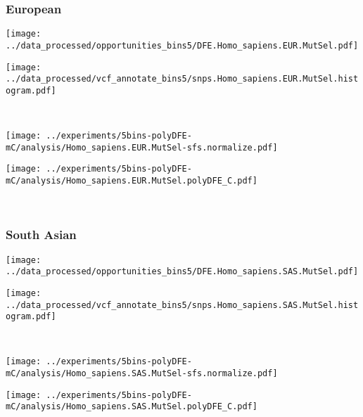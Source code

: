 \subsubsection{European}

\begin{minipage}{0.49\linewidth}
    \texttt{[image: ../data\_processed/opportunities\_bins5/DFE.Homo\_sapiens.EUR.MutSel.pdf]}
\end{minipage}
\begin{minipage}{0.49\linewidth}
    \texttt{[image: ../data\_processed/vcf\_annotate\_bins5/snps.Homo\_sapiens.EUR.MutSel.histogram.pdf]}
\end{minipage}
\\
\begin{minipage}{0.49\linewidth}
    \texttt{[image: ../experiments/5bins-polyDFE-mC/analysis/Homo\_sapiens.EUR.MutSel-sfs.normalize.pdf]}
\end{minipage}
\begin{minipage}{0.49\linewidth}
    \texttt{[image: ../experiments/5bins-polyDFE-mC/analysis/Homo\_sapiens.EUR.MutSel.polyDFE\_C.pdf]}
\end{minipage}
\\

\subsubsection{South Asian}

\begin{minipage}{0.49\linewidth}
    \texttt{[image: ../data\_processed/opportunities\_bins5/DFE.Homo\_sapiens.SAS.MutSel.pdf]}
\end{minipage}
\begin{minipage}{0.49\linewidth}
    \texttt{[image: ../data\_processed/vcf\_annotate\_bins5/snps.Homo\_sapiens.SAS.MutSel.histogram.pdf]}
\end{minipage}
\\
\begin{minipage}{0.49\linewidth}
    \texttt{[image: ../experiments/5bins-polyDFE-mC/analysis/Homo\_sapiens.SAS.MutSel-sfs.normalize.pdf]}
\end{minipage}
\begin{minipage}{0.49\linewidth}
    \texttt{[image: ../experiments/5bins-polyDFE-mC/analysis/Homo\_sapiens.SAS.MutSel.polyDFE\_C.pdf]}
\end{minipage}
\\

